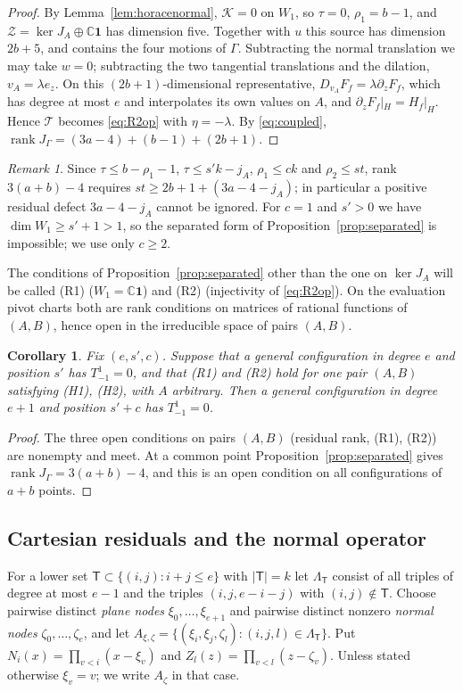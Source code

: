 \documentclass{amsart}
\newtheorem{corollary}[theorem]{Corollary}
\theoremstyle{definition}
\theoremstyle{remark}
\newtheorem{remark}[theorem]{Remark}
\numberwithin{equation}{section}
\newcommand{\CC}{\mathbb{C}}
\DeclareMathOperator{\rank}{rank}
\begin{document}
\begin{proof}
By Lemma~\ref{lem:horacenormal}, $\mathcal K=0$ on $W_1$, so $\tau=0$, $\rho_1=b-1$, and
$\mathcal Z=\ker J_A\oplus\CC\mathbf1$ has dimension five. Together with $u$ this source
has dimension $2b+5$, and contains the four motions of $\Gamma$. Subtracting the normal
translation we may take $w=0$; subtracting the two tangential translations and the
dilation, $v_A=\lambda e_z$. On this $(2b+1)$-dimensional representative,
$D_{v_A}F_f=\lambda\partial_zF_f$, which has degree at most $e$ and interpolates its own
values on $A$, and $\partial_zF_f|_H=H_f|_H$. Hence $\mathcal T$ becomes
\eqref{eq:R2op} with $\eta=-\lambda$. By \eqref{eq:coupled},
$\rank J_\Gamma=(3a-4)+(b-1)+(2b+1)$.
\end{proof}

\begin{remark}\label{rem:capacity}
Since $\tau\le b-\rho_1-1$, $\tau\le s'k-j_A$, $\rho_1\le ck$ and $\rho_2\le st$, rank
$3(a+b)-4$ requires $st\ge2b+1+(3a-4-j_A)$; in particular a positive residual defect
$3a-4-j_A$ cannot be ignored. For $c=1$ and $s'>0$ we have $\dim W_1\ge s'+1>1$, so the
separated form of Proposition~\ref{prop:separated} is impossible; we use only $c\ge2$.
\end{remark}

The conditions of Proposition~\ref{prop:separated} other than the one on $\ker J_A$ will
be called (R1) ($W_1=\CC\mathbf1$) and (R2) (injectivity of \eqref{eq:R2op}). On the
evaluation pivot charts both are rank conditions on matrices of rational functions of
$(A,B)$, hence open in the irreducible space of pairs $(A,B)$.

\begin{corollary}\label{cor:transition}
Fix $(e,s',c)$. Suppose that a general configuration in degree $e$ and position $s'$
has $T^1_{-1}=0$, and that (R1) and (R2) hold for one pair $(A,B)$ satisfying (H1),
(H2), with $A$ arbitrary. Then a general configuration in degree $e+1$ and position
$s'+c$ has $T^1_{-1}=0$.
\end{corollary}

\begin{proof}
The three open conditions on pairs $(A,B)$ (residual rank, (R1), (R2)) are nonempty
and meet. At a common point Proposition~\ref{prop:separated} gives
$\rank J_\Gamma=3(a+b)-4$, and this is an open condition on all configurations of
$a+b$ points.
\end{proof}

\subsection{Cartesian residuals and the normal operator}
For a lower set $\mathsf T\subset\{(i,j):i+j\le e\}$ with $|\mathsf T|=k$ let
$\Lambda_{\mathsf T}$ consist of all triples of degree at most $e-1$ and the triples
$(i,j,e-i-j)$ with $(i,j)\notin\mathsf T$. Choose pairwise distinct \emph{plane nodes}
$\xi_0,\dots,\xi_{e+1}$ and pairwise distinct nonzero \emph{normal nodes}
$\zeta_0,\dots,\zeta_e$, and let
$A_{\xi,\zeta}=\{(\xi_i,\xi_j,\zeta_l):(i,j,l)\in\Lambda_{\mathsf T}\}$. Put
$N_i(x)=\prod_{v<i}(x-\xi_v)$ and $Z_l(z)=\prod_{v<l}(z-\zeta_v)$. Unless stated otherwise
$\xi_v=v$; we write $A_\zeta$ in that case.
\end{document}
